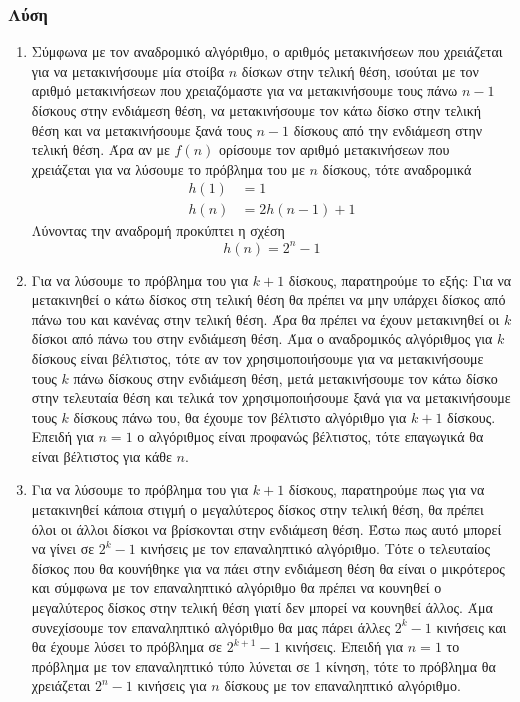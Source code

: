 \documentclass{assignment}
\begin{document}
\subsubsection*{Λύση}
\begin{enumerate}
\item
Σύμφωνα με τον αναδρομικό αλγόριθμο, ο αριθμός μετακινήσεων που χρειάζεται
για να μετακινήσουμε μία στοίβα $n$ δίσκων στην τελική θέση, ισούται με τον 
αριθμό μετακινήσεων που χρειαζόμαστε για να μετακινήσουμε τους πάνω $n-1$ 
δίσκους στην ενδιάμεση θέση, να μετακινήσουμε τον κάτω δίσκο στην τελική θέση 
και να μετακινήσουμε ξανά τους $n-1$ δίσκους από την ενδιάμεση στην τελική θέση.
Άρα αν με $f(n)$ ορίσουμε τον αριθμό μετακινήσεων που χρειάζεται για να 
λύσουμε το πρόβλημα του  με $n$ δίσκους, τότε αναδρομικά
\begin{align*}
h(1) &= 1\\
h(n) &= 2h(n-1) + 1
\end{align*}
Λύνοντας την αναδρομή προκύπτει η σχέση
\begin{equation*} h(n) = 2^n - 1 \end{equation*}

\item
Για να λύσουμε το πρόβλημα του  για $k+1$ 
δίσκους, παρατηρούμε το εξής: Για να μετακινηθεί ο κάτω δίσκος στη 
τελική θέση θα πρέπει να μην υπάρχει δίσκος από πάνω του και κανένας
στην τελική θέση. Άρα θα πρέπει να έχουν μετακινηθεί οι $k$ δίσκοι
από πάνω του στην ενδιάμεση θέση. Άμα ο αναδρομικός αλγόριθμος για $k$ 
δίσκους είναι βέλτιστος, τότε αν τον χρησιμοποιήσουμε για να μετακινήσουμε
τους $k$ πάνω δίσκους στην ενδιάμεση θέση, μετά μετακινήσουμε τον κάτω
δίσκο στην τελευταία θέση και τελικά τον χρησιμοποιήσουμε ξανά για να 
μετακινήσουμε τους $k$ δίσκους πάνω του, θα έχουμε τον βέλτιστο αλγόριθμο
για $k+1$ δίσκους. Επειδή για $n=1$ ο αλγόριθμος είναι προφανώς βέλτιστος,
τότε επαγωγικά θα είναι βέλτιστος για κάθε $n$.

\item
Για να λύσουμε το πρόβλημα του  για $k+1$ δίσκους, παρατηρούμε
πως για να μετακινηθεί κάποια στιγμή ο μεγαλύτερος δίσκος στην τελική θέση, θα 
πρέπει όλοι οι άλλοι δίσκοι να βρίσκονται στην ενδιάμεση θέση. Έστω πως
αυτό μπορεί να γίνει σε $2^k - 1$ κινήσεις με τον επαναληπτικό αλγόριθμο. Τότε
ο τελευταίος δίσκος που θα κουνήθηκε για να πάει στην ενδιάμεση θέση θα είναι
ο μικρότερος και σύμφωνα με τον επαναληπτικό αλγόριθμο θα πρέπει να κουνηθεί
ο μεγαλύτερος δίσκος στην τελική θέση γιατί δεν μπορεί να κουνηθεί άλλος. 
Άμα συνεχίσουμε τον επαναληπτικό αλγόριθμο θα μας πάρει άλλες $2^k-1$ 
κινήσεις και θα έχουμε λύσει το πρόβλημα σε $2^{k+1} - 1$ κινήσεις.
Επειδή για $n=1$ το πρόβλημα με τον επαναληπτικό τύπο λύνεται σε 1 κίνηση,
τότε το πρόβλημα θα χρειάζεται $2^n -1$ κινήσεις για $n$ δίσκους με τον
επαναληπτικό αλγόριθμο.
\end{enumerate}
\end{document}

